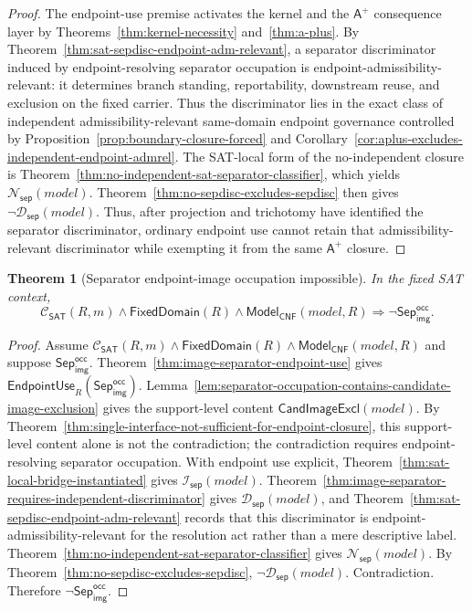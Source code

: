 \documentclass[11pt]{article}
\newtheorem{theorem}{Theorem}[section]
\theoremstyle{definition}
\theoremstyle{remark}
\newcommand{\SepImgOcc}{\mathsf{Sep}_{\mathsf{img}}^{\mathsf{occ}}}
\newcommand{\Aplus}{\mathsf{A}^{+}}
\newcommand{\ClayCtx}{\mathcal{C}_{\mathsf{SAT}}(R,m)}
\newcommand{\EndpointUse}{\mathsf{EndpointUse}}
\newcommand{\FixedDom}{\mathsf{FixedDomain}}
\newcommand{\SepIndBridge}{\mathcal{I}_{\mathsf{sep}}}
\newcommand{\SepDisc}{\mathcal{D}_{\mathsf{sep}}}
\newcommand{\NoSepDisc}{\mathcal{N}_{\mathsf{sep}}}
\newcommand{\ModelOfCnf}{\mathsf{Model}_{\mathsf{CNF}}}
\newcommand{\CandImageExcl}{\mathsf{CandImageExcl}}
\begin{document}
\begin{proof}
The endpoint-use premise activates the kernel and the \(\Aplus\) consequence layer by Theorems~\ref{thm:kernel-necessity} and~\ref{thm:a-plus}. By Theorem~\ref{thm:sat-sepdisc-endpoint-adm-relevant}, a separator discriminator induced by endpoint-resolving separator occupation is endpoint-admissibility-relevant: it determines branch standing, reportability, downstream reuse, and exclusion on the fixed carrier. Thus the discriminator lies in the exact class of independent admissibility-relevant same-domain endpoint governance controlled by Proposition~\ref{prop:boundary-closure-forced} and Corollary~\ref{cor:aplus-excludes-independent-endpoint-admrel}. The SAT-local form of the no-independent closure is Theorem~\ref{thm:no-independent-sat-separator-classifier}, which yields \(\NoSepDisc(model)\). Theorem~\ref{thm:no-sepdisc-excludes-sepdisc} then gives \(\neg\SepDisc(model)\). Thus, after projection and trichotomy have identified the separator discriminator, ordinary endpoint use cannot retain that admissibility-relevant discriminator while exempting it from the same \(\Aplus\) closure.
\end{proof}

\begin{theorem}[Separator endpoint-image occupation impossible]\label{thm:no-image-sep}
In the fixed SAT context,
\[
  \ClayCtx\wedge\FixedDom(R)\wedge\ModelOfCnf(model,R)
  \Rightarrow \neg\SepImgOcc.
\]
\end{theorem}

\begin{proof}
Assume \(\ClayCtx\wedge\FixedDom(R)\wedge\ModelOfCnf(model,R)\) and suppose \(\SepImgOcc\). Theorem~\ref{thm:image-separator-endpoint-use} gives \(\EndpointUse_R(\SepImgOcc)\). Lemma~\ref{lem:separator-occupation-contains-candidate-image-exclusion} gives the support-level content \(\CandImageExcl(model)\). By Theorem~\ref{thm:single-interface-not-sufficient-for-endpoint-closure}, this support-level content alone is not the contradiction; the contradiction requires endpoint-resolving separator occupation. With endpoint use explicit, Theorem~\ref{thm:sat-local-bridge-instantiated} gives \(\SepIndBridge(model)\). Theorem~\ref{thm:image-separator-requires-independent-discriminator} gives \(\SepDisc(model)\), and Theorem~\ref{thm:sat-sepdisc-endpoint-adm-relevant} records that this discriminator is endpoint-admissibility-relevant for the resolution act rather than a mere descriptive label. Theorem~\ref{thm:no-independent-sat-separator-classifier} gives \(\NoSepDisc(model)\). By Theorem~\ref{thm:no-sepdisc-excludes-sepdisc}, \(\neg\SepDisc(model)\). Contradiction. Therefore \(\neg\SepImgOcc\).
\end{proof}
\end{document}
